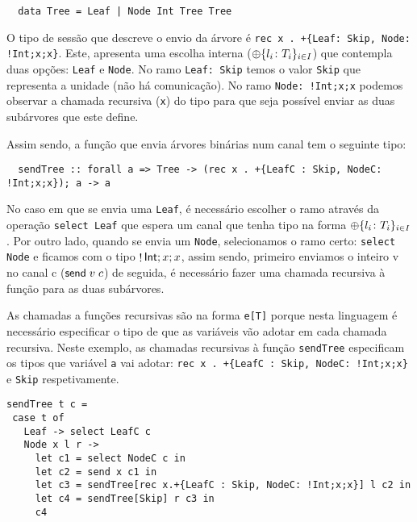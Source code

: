 \begin{lstlisting}
  data Tree = Leaf | Node Int Tree Tree
\end{lstlisting}

O tipo de sessão que descreve o envio da árvore é \lstinline"rec x . +{Leaf: Skip, Node: !Int;x;x}". Este, apresenta uma escolha interna ($\oplus\{l_i\colon T_i\}_{i\in I}$) que contempla duas opções: \lstinline"Leaf" e \lstinline"Node". No ramo \lstinline"Leaf: Skip" temos o valor \lstinline"Skip" que representa a unidade (não há comunicação). No ramo \lstinline"Node: !Int;x;x" podemos observar a chamada recursiva (\lstinline"x") do tipo para que seja possível enviar as duas subárvores que este define.

Assim sendo, a função que envia árvores binárias num canal tem o seguinte tipo:

\begin{lstlisting}
  sendTree :: forall a => Tree -> (rec x . +{LeafC : Skip, NodeC: !Int;x;x}); a -> a
\end{lstlisting}


No caso em que se envia uma \lstinline"Leaf", é necessário escolher o ramo através da operação \lstinline"select Leaf" que espera um canal que tenha tipo na forma $\oplus\{l_i\colon T_i\}_{i\in I}$.
Por outro lado, quando se envia um \lstinline"Node", selecionamos o ramo certo: \lstinline"select Node" e ficamos com o tipo $\mathop!\mathsf{Int};x;x$, assim sendo, primeiro enviamos o inteiro v no canal c ($\mathsf{send}\;v\; c$) de seguida, é necessário fazer uma chamada recursiva à função para as duas subárvores.

As chamadas a funções recursivas são na forma \lstinline"e[T]" porque nesta linguagem é necessário especificar o tipo de que as variáveis vão adotar em cada chamada recursiva.
Neste exemplo, as chamadas recursivas à função \lstinline"sendTree" especificam os tipos que variável \lstinline"a" vai adotar: \lstinline"rec x . +{LeafC : Skip, NodeC: !Int;x;x}" e \lstinline"Skip" respetivamente.

\begin{lstlisting}
sendTree t c =
 case t of
   Leaf -> select LeafC c
   Node x l r ->
     let c1 = select NodeC c in
     let c2 = send x c1 in
     let c3 = sendTree[rec x.+{LeafC : Skip, NodeC: !Int;x;x}] l c2 in
     let c4 = sendTree[Skip] r c3 in
     c4

\end{lstlisting}

